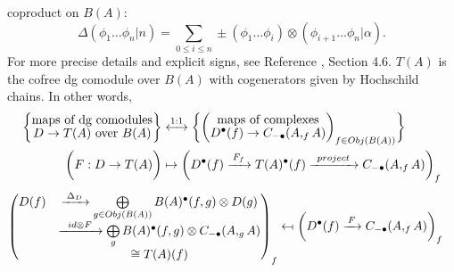 coproduct on $B(A)$:
$$\Delta(\phi_1\dots \phi_n|n) = 
\sum \limits_{0 \leq i \leq n}
\pm (\phi_1 \dots \phi_i) \otimes (\phi_{i+1}\dots \phi_n|\alpha).$$
%
For more precise details and explicit signs, 
see Reference \cite{T}, Section 4.6. 
$T(A)$ is the cofree dg comodule over $B(A)$ with 
cogenerators given by Hochschild chains. 
In other words, 
\begin{equation*}
\begin{split}
\bigg\{ \let\scriptstyle\textstyle
\substack{\textrm{maps of dg comodules}\\
  D \to T(A) \textrm{ over }B(A)} 
\bigg\}
&\overset{1:1}{\longleftrightarrow}
\bigg\{ \bigg( \let\scriptstyle\textstyle
\substack{\textrm{maps of complexes}\\
  D^\bullet(f) \to C_{-\bullet}(A, _fA)}
\bigg)_{f \in Obj(B(A))} \bigg\}\\
%
\bigg( F:D\to T(A) \bigg)
&\mapsto
\bigg(
  D^\bullet(f) 
  \xrightarrow{F_f} T(A)^\bullet(f)
  \xrightarrow{project}
  C_{-\bullet}(A, _fA)
\bigg)_f
\end{split}
\end{equation*}
\begin{align*}  
\begin{pmatrix}
  D(f)
  &\xrightarrow{\Delta_D}
  \bigoplus \limits_{g \in Obj(B(A))}
  B(A)^\bullet(f,g) \otimes D(g)\\
  &\xrightarrow{id \otimes F}
  \bigoplus \limits_g
  B(A)^\bullet(f,g) \otimes C_{-\bullet}(A, _gA)\\
  &\cong T(A)(f)
  \end{pmatrix} _f
&\leftmapsto  
\bigg( D^\bullet(f) \xrightarrow{F}
  C_{-\bullet}(A, _fA)
  \bigg)_f
\end{align*}